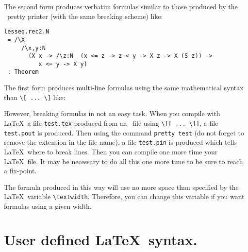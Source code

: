 The second form produces verbatim formulas similar to those produced by the
\AFD\ pretty printer (with the same breaking scheme) like:
\begin{verbatim}
lesseq.rec2.N
 = /\X
     /\x,y:N 
       (X x -> /\z:N  (x <= z -> z < y -> X z -> X (S z)) -> 
          x <= y -> X y)
 : Theorem
\end{verbatim}

The first form produces multi-line formulas using the same mathematical syntax
than \verb#\[ ... \]# like:

However, breaking formulas in not an easy task. When you compile with \LaTeX\
a file {\tt test.tex} produced from an \AFD\ file using \verb#\[[ ... \]]#, a
file {\tt test.pout} is produced. Then using the command {\tt pretty test} (do
not forget to remove the extension in the file name), a file {\tt test.pin} is
produced which tells \LaTeX\ where to break lines. Then you can compile one
more time your \LaTeX\ file. It may be necessary to do all this one more time
to be sure to reach a fix-point.

The formula produced in this way will use no more space than specified by the
\LaTeX\ variable \verb#\textwidth#. Therefore, you can change this variable if
you want formulas using a given width.

\section{User defined \LaTeX\ syntax.}

